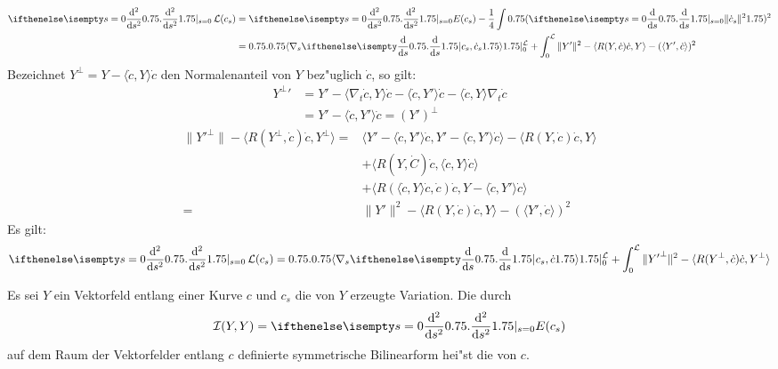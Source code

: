 \begin{align*}
	\difffrac[s=0]{^2}{s^2} \calL(c_s) &= \difffrac[s=0]{^2}{s^2} E(c_s) - \frac{1}{4} \int \left( \difffrac[s=0]{}{s} \| \dot c_s \|^2 \right)^2 \\
	&= \left.\left\langle \nabla_s \difffrac{}{s} c_s, \dot c_s \right\rangle\right|_{0}^{\calL} + \int_0^{\calL} \| Y' \|^2 - \langle R(Y, \dot c) \dot c, Y \rangle - ( \langle Y', \dot c \rangle )^2
\end{align*}
Bezeichnet $Y^\perp = Y - \langle \dot c, Y \rangle \dot c$ den Normalenanteil von $Y$ bez"uglich $\dot c$, so gilt:
\begin{align*}
	{Y^\perp}' &= Y' - \langle \nabla_t \dot c, Y \rangle \dot c - \langle \dot c, Y' \rangle \dot c - \langle \dot c, Y \rangle \nabla_t \dot c \\
	&= Y' - \langle \dot c, Y' \rangle \dot c = (Y')^\perp
\end{align*}
\begin{align*}
	\| {Y'}^\perp \| - \langle R(Y^\perp, \dot c) \dot c, Y^\perp \rangle ={}& \langle Y' - \langle \dot c, Y' \rangle \dot c, Y' - \langle \dot c, Y' \rangle \dot c \rangle - \langle R(Y, \dot c) \dot c, Y \rangle \\
	   & + \langle R(Y, \dot C) \dot c, \langle \dot c, Y \rangle \dot c \rangle \\
	   & + \langle R ( \langle \dot c, Y \rangle \dot c, \dot c) \dot c, Y - \langle \dot c, Y' \rangle \dot c \rangle \\
	={}& \| Y' \|^2 - \langle R(Y, \dot c) \dot c, Y \rangle - ( \langle Y', \dot c \rangle )^2
\end{align*}
Es gilt:
\begin{align*}
	\difffrac[s=0]{^2}{s^2} \calL(c_s) = \left.\left\langle \nabla_s \difffrac{}{s} c_s, \dot c \right\rangle\right|_{0}^{\calL} + \int_0^{\calL} \| {Y'}^\perp \|^2 - \langle R(Y^\perp, \dot c) \dot c, Y^\perp \rangle
\end{align*}
\begin{Dfn}
Es sei $Y$ ein Vektorfeld entlang einer Kurve $c$ und $c_s$ die von $Y$ erzeugte Variation. Die durch
\begin{align*}
	\calI(Y,Y) = \difffrac[s=0]{^2}{s^2} E(c_s)
\end{align*}
auf dem Raum der Vektorfelder entlang $c$ definierte symmetrische Bilinearform hei"st die  von $c$.
\end{Dfn}